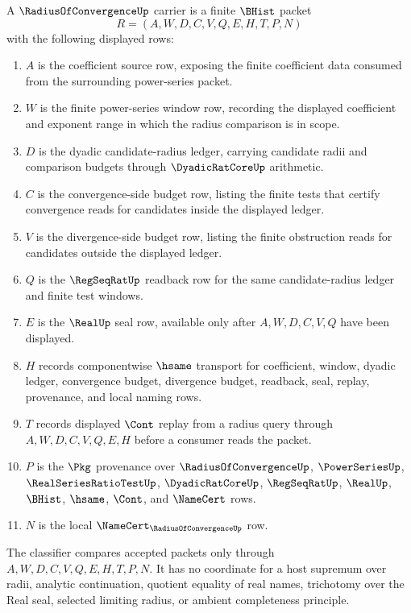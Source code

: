 \begin{definition}
\label{def:radius-of-convergence-carrier}
A $\RadiusOfConvergenceUp$ carrier is a finite $\BHist$ packet
$$
R=(A,W,D,C,V,Q,E,H,T,P,N)
$$
with the following displayed rows:
\begin{enumerate}
\item $A$ is the coefficient source row, exposing the finite coefficient data consumed from the surrounding power-series packet.
\item $W$ is the finite power-series window row, recording the displayed coefficient and exponent range in which the radius comparison is in scope.
\item $D$ is the dyadic candidate-radius ledger, carrying candidate radii and comparison budgets through $\DyadicRatCoreUp$ arithmetic.
\item $C$ is the convergence-side budget row, listing the finite tests that certify convergence reads for candidates inside the displayed ledger.
\item $V$ is the divergence-side budget row, listing the finite obstruction reads for candidates outside the displayed ledger.
\item $Q$ is the $\RegSeqRatUp$ readback row for the same candidate-radius ledger and finite test windows.
\item $E$ is the $\RealUp$ seal row, available only after $A,W,D,C,V,Q$ have been displayed.
\item $H$ records componentwise $\hsame$ transport for coefficient, window, dyadic ledger, convergence budget, divergence budget, readback, seal, replay, provenance, and local naming rows.
\item $T$ records displayed $\Cont$ replay from a radius query through $A,W,D,C,V,Q,E,H$ before a consumer reads the packet.
\item $P$ is the $\Pkg$ provenance over $\RadiusOfConvergenceUp$, $\PowerSeriesUp$, $\RealSeriesRatioTestUp$, $\DyadicRatCoreUp$, $\RegSeqRatUp$, $\RealUp$, $\BHist$, $\hsame$, $\Cont$, and $\NameCert$ rows.
\item $N$ is the local $\NameCert_{\RadiusOfConvergenceUp}$ row.
\end{enumerate}
The classifier compares accepted packets only through $A,W,D,C,V,Q,E,H,T,P,N$. It has no coordinate for a host supremum over radii, analytic continuation, quotient equality of real names, trichotomy over the Real seal, selected limiting radius, or ambient completeness principle.
\end{definition}

